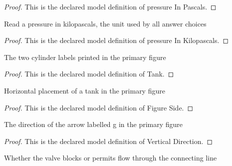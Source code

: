 \begin{proof}
  This is the declared model definition of pressure In Pascals.
\end{proof}
\begin{definition}
  \label{def:physics:phyx-mini-0389:phyxminiproblems-problemphyxmini0389-pressureinkilopascals}
  Read a pressure in kilopascals, the unit used by all answer choices
\end{definition}
\begin{proof}
  This is the declared model definition of pressure In Kilopascals.
\end{proof}
\begin{definition}[Tank]
  \label{def:physics:phyx-mini-0389:phyxminiproblems-problemphyxmini0389-tank}
  The two cylinder labels printed in the primary figure
\end{definition}
\begin{proof}
  This is the declared model definition of Tank.
\end{proof}
\begin{definition}
  \label{def:physics:phyx-mini-0389:phyxminiproblems-problemphyxmini0389-figureside}
  Horizontal placement of a tank in the primary figure
\end{definition}
\begin{proof}
  This is the declared model definition of Figure Side.
\end{proof}
\begin{definition}
  \label{def:physics:phyx-mini-0389:phyxminiproblems-problemphyxmini0389-verticaldirection}
  The direction of the arrow labelled g in the primary figure
\end{definition}
\begin{proof}
  This is the declared model definition of Vertical Direction.
\end{proof}
\begin{definition}
  \label{def:physics:phyx-mini-0389:phyxminiproblems-problemphyxmini0389-valvestate}
  Whether the valve blocks or permits flow through the connecting line
\end{definition}
